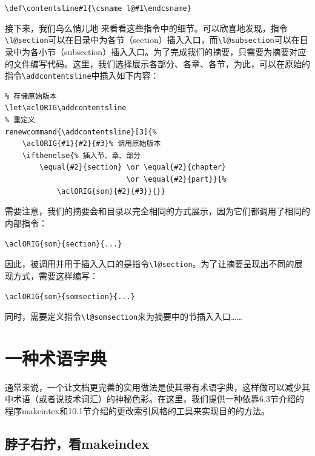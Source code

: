 \begin{dmd}
\verb|\def\contentsline#1{\csname l@#1\endcsname}|
\end{dmd}

接下来，我们鸟么悄{\footnotesize 儿}地%
来看看这些指令中的细节。可以欣喜地发现，指令\verb|\l@section|可以在目录中为各节（section）插入入口，而\verb|\l@subsection|可以在目录中为各小节（subsection）插入入口。为了完成我们的摘要，只需要为摘要对应的文件编写代码。这里，我们选择展示各部分、各章、各节，为此，可以在原始的指令\verb|\addcontentsline|中插入如下内容：

\begin{dmd}
\begin{verbatim}
% 存储原始版本
\let\aclORIG\addcontentsline
% 重定义
renewcommand{\addcontentsline}[3]{% 
    \aclORIG{#1}{#2}{#3}% 调用原始版本
    \ifthenelse{% 插入节、章、部分
        \equal{#2}{section} \or \equal{#2}{chapter} 
                            \or \equal{#2}{part}}{%
            \aclORIG{som}{#2}{#3}}{}}
\end{verbatim}
\end{dmd}

\begin{exclamation}
需要注意，我们的摘要会和目录以完全相同的方式展示，因为它们都调用了相同的内部指令：

\begin{dmd}
\verb|\aclORIG{som}{section}{...}|
\end{dmd}

因此，被调用并用于插入入口的是指令\verb|\l@section|。为了让摘要呈现出不同的展现方式，需要这样编写：

\begin{dmd}
\verb|\aclORIG{som}{somsection}{...}|
\end{dmd}

同时，需要定义指令\verb|\l@somsection|来为摘要中的节插入入口……
\end{exclamation}

\section{一种术语字典}

通常来说，一个让文档更完善的实用做法是使其带有术语字典，这样做可以减少其中术语（或者说技术词汇）的神秘色彩。在这里，我们提供一种依靠6.3节介绍的程序\textsf{makeintex}和10.1节介绍的更改索引风格的工具来实现目的的方法。

\subsection{脖子右拧，看\textsf{makeindex}}

